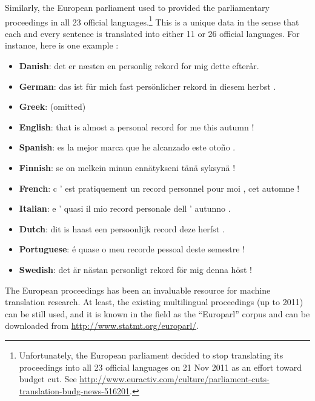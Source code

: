\documentclass{report}
\begin{document}
Similarly, the European parliament used to provided the parliamentary
proceedings in all 23 official languages.\footnote{
    Unfortunately, the European parliament decided to stop translating its
    proceedings into all 23 official languages on 21 Nov 2011 as an effort
    toward budget cut. See
    \url{http://www.euractiv.com/culture/parliament-cuts-translation-budg-news-516201}.
} This is a unique data in the sense that each and every sentence is translated
into either 11 or 26 official languages. For instance, here is one example
\citep{koehn2005europarl}:
\begin{itemize}
    \itemsep 0em
    \item \textbf{Danish}: det er næsten en personlig rekord for mig dette
        efter{\aa}r.
    \item \textbf{German}: das ist f\"ur mich fast pers\"onlicher rekord in diesem
        herbst .
    \item \textbf{Greek}: (omitted)
    \item \textbf{English}: that is almost a personal record for me this autumn !
    \item \textbf{Spanish}: es la mejor marca que he alcanzado este oto\~no .
    \item \textbf{Finnish}: se on melkein minun enn\"atykseni t\"an\"a syksyn\"a !
    \item \textbf{French}: c ' est pratiquement un record personnel pour moi , cet
        automne !
    \item \textbf{Italian}: e ' quasi il mio record personale dell ' autunno .
    \item \textbf{Dutch}: dit is haast een persoonlijk record deze herfst .
    \item \textbf{Portuguese}: \'e quase o meu recorde pessoal deste semestre !
    \item \textbf{Swedish}: det \"ar n\"astan personligt rekord f\"or mig denna h\"ost !
\end{itemize}

The European proceedings has been an invaluable resource for machine translation
research. At least, the existing multilingual proceedings (up to 2011) can be
still used, and it is known in the field as the ``Europarl'' corpus
\citep{koehn2005europarl} and can be downloaded from
\url{http://www.statmt.org/europarl/}. 
\end{document}
